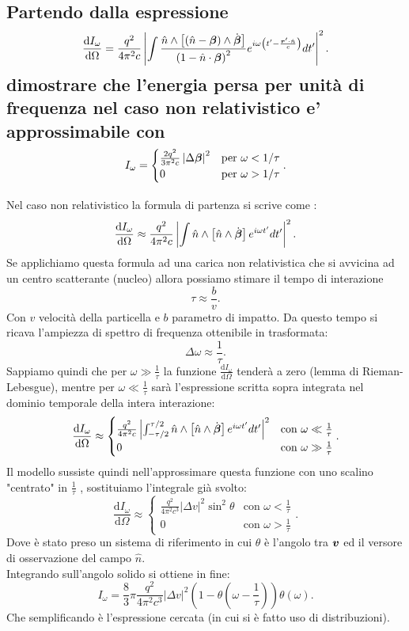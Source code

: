 \subsection[ Energia persa per unità di frequenza per irraggiamento nel caso non relativistico]{Partendo dalla espressione\[
	\frac{\mbox{d} I_{\omega}}{\mbox{d} \Omega} = \frac{q^2}{4\pi^2 c}
	\left|\int\frac{\hat{n}\wedge\left[\left(\hat{n}-\boldsymbol{\beta}\right)\wedge\dot{\boldsymbol{\beta}}\right]}{\left(1-\hat{n}\cdot\boldsymbol{\beta}\right)^2}
	e^{i\omega\left(t'-\frac{\boldsymbol{r}'\cdot\hat{n}}{c}\right)}dt'\right|^2.\] 
dimostrare che l’energia persa per unità di frequenza nel caso non relativistico e’ approssimabile con \[
	I_{\omega}=
	\begin{cases}
		\frac{2q^2}{3\pi^2 c}\left| \Delta \boldsymbol{\beta} \right|^2  &\text{per } \omega< 1 /\tau\\  
		0 & \text{per } \omega > 1 /\tau
	\end{cases}.\] }
\label{sec:4.b.6}
Nel caso non relativistico la formula di partenza si scrive come :
\[
	\frac{\mbox{d} I_{\omega}}{\mbox{d} \Omega} \approx \frac{q^2}{4\pi^2 c}
	\left|\int\hat{n}\wedge\left[\hat{n}\wedge\dot{\boldsymbol{\beta}}\right]
	e^{i\omega t'}dt'\right|^2
.\] 
Se applichiamo questa formula ad una carica non relativistica che si avvicina ad un centro scatterante (nucleo) allora possiamo stimare il tempo di interazione \[
	\tau \approx \frac{b}{v}
.\] 
Con $v$ velocità della particella e $b$ parametro di impatto. Da questo tempo si ricava l'ampiezza di spettro di frequenza ottenibile in trasformata: \[
	\Delta \omega \approx \frac{1}{\tau}
.\] 
Sappiamo quindi che per $\omega\gg \frac{1}{\tau}$ la funzione $\frac{\mbox{d} I_{\omega}}{\mbox{d} \Omega}$ tenderà a zero (lemma di Rieman-Lebesgue), mentre per $\omega\ll \frac{1}{\tau}$ sarà l'espressione scritta sopra integrata nel dominio temporale della intera interazione:\[
	\frac{\mbox{d} I_{\omega}}{\mbox{d} \Omega} \approx 
	\begin{cases}
		\frac{q^2}{4\pi^2 c}
		\left|\int_{- \tau /2}^{\tau /2}\hat{n}\wedge\left[\hat{n}\wedge\dot{\boldsymbol{\beta}}\right]
		e^{i\omega t'}dt'\right|^2 		& \text{con } \omega \ll \frac{1}{\tau}\\
		0					& \text{con } \omega \gg \frac{1}{\tau}
	\end{cases}
.\] 
Il modello sussiste quindi nell'approssimare questa funzione con uno scalino "centrato" in $\frac{1}{\tau}$ , sostituiamo l'integrale già svolto:
\[
	\frac{\mbox{d} I_{\omega}}{\mbox{d} \Omega} \approx 
	\begin{cases}
		\frac{q^2}{4\pi^2 c^3} \left| \Delta v \right|^2\sin^2\theta			& \text{con } \omega < \frac{1}{\tau}\\
		0										& \text{con } \omega > \frac{1}{\tau}
	\end{cases}
.\] 
Dove è stato preso un sistema di riferimento in cui $\theta$ è l'angolo tra $\boldsymbol{v}$ ed il versore di osservazione del campo $\hat{n}$. \\
Integrando sull'angolo solido si ottiene in fine:
\[
	I_{\omega}=\frac{8}{3}\pi\frac{q^2}{4\pi^2c^3}\left|\Delta v\right|^2\left(1-\theta\left(\omega-\frac{1}{\tau}\right)\right)\theta\left(\omega\right)
.\] 
Che semplificando è l'espressione cercata (in cui si è fatto uso di distribuzioni).

